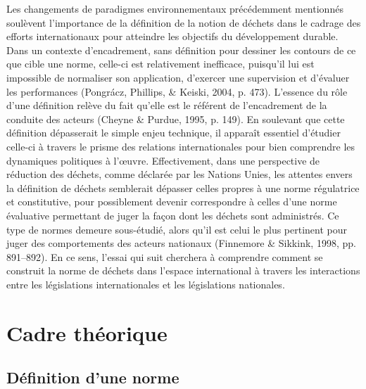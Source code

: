 \documentclass[12pt]{ulaval}
\begin{document}
Les changements de paradigmes environnementaux précédemment mentionnés soulèvent l'importance de la définition de la notion de déchets dans le cadrage des efforts internationaux pour atteindre les objectifs du développement durable. Dans un contexte d'encadrement, sans définition pour dessiner les contours de ce que cible une norme, celle-ci est relativement inefficace, puisqu'il lui est impossible de normaliser son application, d'exercer une supervision et d'évaluer les performances (Pongrácz, Phillips, \& Keiski, 2004, p. 473). L'essence du rôle d'une définition relève du fait qu'elle est le référent de l'encadrement de la conduite des acteurs (Cheyne \& Purdue, 1995, p. 149). En soulevant que cette définition dépasserait le simple enjeu technique, il apparaît essentiel d'étudier celle-ci à travers le prisme des relations internationales pour bien comprendre les dynamiques politiques à l'œuvre. Effectivement, dans une perspective de réduction des déchets, comme déclarée par les Nations Unies, les attentes envers la définition de déchets semblerait dépasser celles propres à une norme régulatrice et constitutive, pour possiblement devenir correspondre à celles d'une norme évaluative permettant de juger la façon dont les déchets sont administrés. Ce type de normes demeure sous-étudié, alors qu'il est celui le plus pertinent pour juger des comportements des acteurs nationaux (Finnemore \& Sikkink, 1998, pp. 891--892). En ce sens, l'essai qui suit cherchera à comprendre comment se construit la norme de déchets dans l'espace international à travers les interactions entre les législations internationales et les législations nationales.

\section{Cadre théorique}\label{cadre-thuxe9orique}

\subsection{Définition d'une norme}\label{duxe9finition-dune-norme}
\end{document}
